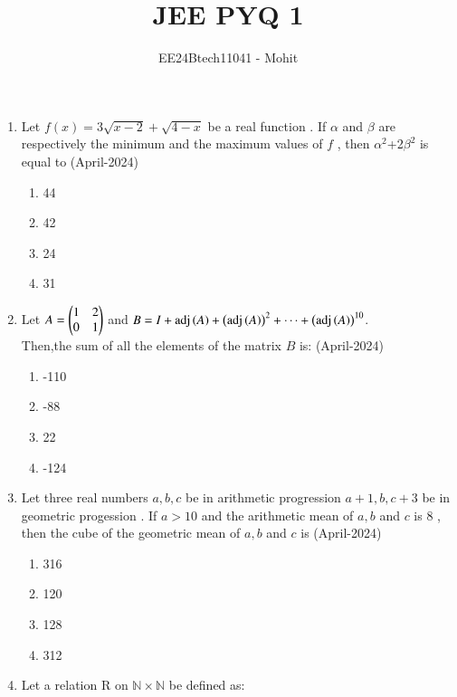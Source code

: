 \documentclass[journal,12pt,onecolumn]{IEEEtran}
\theoremstyle{remark}
\begin{document}
\title{JEE PYQ 1}
\author{EE24Btech11041 - Mohit}
\maketitle
\renewcommand{\thefigure}{\theenumi}
\renewcommand{\thetable}{\theenumi}
\begin{enumerate}
\item Let $f(x)=3\sqrt{x-2}+\sqrt{4-x}$ be a real function . If $\alpha$ and $\beta$ are respectively the minimum and the maximum values of $f$ , then $\alpha^2$+2$\beta^2$ is equal to
\hfill{(April-2024)}
\begin{multicols}{2}
\begin{enumerate}
\item 44
\item 42 
\item 24
\item 31
\end{enumerate}
\end{multicols}
\item Let $A=\begin{pmatrix}1&2\\0&1\end{pmatrix}$ and $B=I+\operatorname{adj}\left(A\right)+\left(\operatorname{adj}\left(A\right)\right)^2+\dots+\left(\operatorname{adj}\left(A\right)\right)^{10}$.\\
Then,the sum of all the elements of the matrix $B$ is:
\hfill{(April-2024)}
\begin{multicols}{2}
\begin{enumerate}
\item -110
\item -88 
\item 22
\item -124
\end{enumerate}
\end{multicols}
\item Let three real numbers $a,b,c$ be in arithmetic progression $a+1,b,c+3$ be in geometric progession . If $a>10$ and the arithmetic mean of $a,b$ and $c$ is 8 , then the cube of the geometric mean of $a,b$ and $c$ is
\hfill{(April-2024)}
\begin{multicols}{2}
\begin{enumerate}
\item 316
\item 120
\item 128
\item 312
\end{enumerate}
\end{multicols}
\item Let a relation R on $\mathbb{N} \times \mathbb{N}$ be defined as:\\

\end{enumerate}
\end{document}
